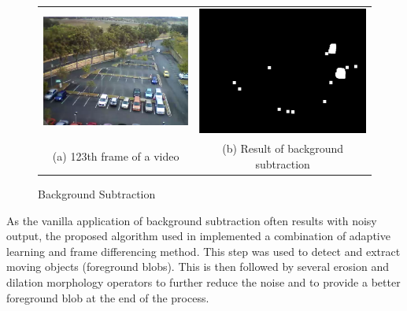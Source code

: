 \begin{figure}[htb!]
  \centering
\begin{tabular}{cc}
 \includegraphics[width=0.4\linewidth]{image/general/bgs1.png} &  \includegraphics[width=0.4\linewidth]{image/general/bgs2.png}  \\ 
(a) 123th frame of a video & (b) Result of background subtraction \\
\end{tabular}
\caption{Background Subtraction} 
\label{fig:bgs}
\end{figure}

As the vanilla application of background subtraction often results with noisy output, the proposed algorithm used in \cite{lim2017} implemented a combination of adaptive learning and frame differencing method. This step was used to detect and extract moving objects (foreground blobs). This is then followed by several erosion and dilation morphology operators to further reduce the noise and to provide a better foreground blob at the end of the process.

